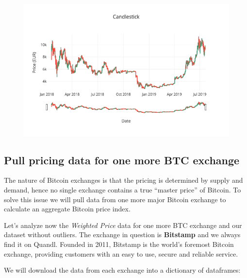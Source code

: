 \documentclass[11pt]{article}
\makeatletter
\def\maxwidth{\ifdim\Gin@nat@width>\linewidth\linewidth
    \else\Gin@nat@width\fi}
\let\Oldincludegraphics\includegraphics
\renewcommand{\includegraphics}[1]{\Oldincludegraphics[width=.8\maxwidth]{#1}}
\makeatother
\begin{document}
\begin{figure}[H]
	\centering
		\includegraphics{4.png}
\end{figure}    
    
    \hypertarget{pull-pricing-data-for-one-more-btc-exchange}{%
\subsection{Pull pricing data for one more BTC
exchange}\label{pull-pricing-data-for-one-more-btc-exchange}}

    The nature of Bitcoin exchanges is that the pricing is determined by
supply and demand, hence no single exchange contains a true ``master
price'' of Bitcoin. To solve this issue we will pull data from one more
major Bitcoin exchange to calculate an aggregate Bitcoin price index.

    Let's analyze now the \emph{Weighted Price} data for one more BTC
exchange and our dataset without outliers. The exchange in question is
\textbf{Bitstamp} and we always find it on Quandl. Founded in 2011,
Bitstamp is the world's foremost Bitcoin exchange, providing customers
with an easy to use, secure and reliable service.

    We will download the data from each exchange into a dictionary of
dataframes:
\end{document}
